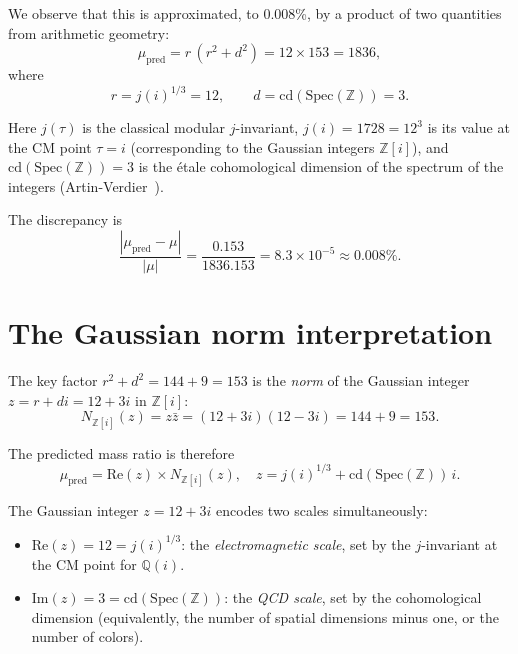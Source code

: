 \documentclass[aps,prl,twocolumn,superscriptaddress,nofootinbib]{revtex4-2}
\newcommand{\Z}{\mathbb{Z}}
\newcommand{\Q}{\mathbb{Q}}
\newcommand{\Spec}{\mathrm{Spec}}
\newcommand{\cd}{\mathrm{cd}}
\begin{document}
We observe that this is approximated, to 0.008\%, by a product of
two quantities from arithmetic geometry:
\begin{equation}
  \mu_{\mathrm{pred}} = r \,(r^2 + d^2) = 12 \times 153 = 1836,
  \label{eq:pred}
\end{equation}
where
\begin{equation}
  r = j(i)^{1/3} = 12, \qquad d = \cd(\Spec(\Z)) = 3.
  \label{eq:defs}
\end{equation}

Here $j(\tau)$ is the classical modular $j$-invariant,
$j(i) = 1728 = 12^3$ is its value at the CM point $\tau = i$
(corresponding to the Gaussian integers $\Z[i]$),
and $\cd(\Spec(\Z)) = 3$ is the \'etale cohomological dimension
of the spectrum of the integers (Artin-Verdier~\cite{ArtinVerdier}).

The discrepancy is
\begin{equation}
  \frac{|\mu_{\mathrm{pred}} - \mu|}{|\mu|}
  = \frac{0.153}{1836.153} = 8.3 \times 10^{-5}
  \approx 0.008\%.
\end{equation}

\section{The Gaussian norm interpretation}

The key factor $r^2 + d^2 = 144 + 9 = 153$ is the
\emph{norm} of the Gaussian integer $z = r + di = 12 + 3i$
in $\Z[i]$:
\begin{equation}
  N_{\Z[i]}(z) = z \bar{z} = (12 + 3i)(12 - 3i) = 144 + 9 = 153.
  \label{eq:norm}
\end{equation}

The predicted mass ratio is therefore
\begin{equation}
  \boxed{\;\mu_{\mathrm{pred}}
  = \mathrm{Re}(z) \times N_{\Z[i]}(z),
  \quad z = j(i)^{1/3} + \cd(\Spec(\Z))\,i.\;}
  \label{eq:main}
\end{equation}

The Gaussian integer $z = 12 + 3i$ encodes two scales simultaneously:
\begin{itemize}
\item $\mathrm{Re}(z) = 12 = j(i)^{1/3}$:
  the \emph{electromagnetic scale}, set by the $j$-invariant
  at the CM point for $\Q(i)$.
\item $\mathrm{Im}(z) = 3 = \cd(\Spec(\Z))$:
  the \emph{QCD scale}, set by the cohomological dimension
  (equivalently, the number of spatial dimensions minus one,
  or the number of colors).
\end{itemize}
\end{document}
